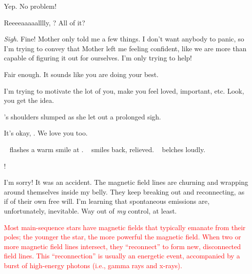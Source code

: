 \documentclass[main.tex]{subfiles}
\begin{document}
\par \Maia Yep.  No problem!  

\par \Sterope Reeeeaaaaalllly, \rmmaia?  All of it?

\par \Maia \textit{Sigh}.  Fine!  Mother only told me a few things.  I don't want anybody to panic, so I'm trying to convey that Mother left me feeling confident, like we are more than capable of figuring it out for ourselves.  I'm only trying to help!  

\par \Sterope Fair enough.  It sounds like you are doing your best.

\par \Maia I'm trying to motivate the lot of you, make you feel loved, important, etc.  Look, you get the idea. 

\par \nar \rmmaia's shoulders slumped as she let out a prolonged sigh.

\par \Sterope It's okay, \rmmaia.  We love you too.

\par \nar \rmsterope~ flashes a warm smile at \rmmaia.  \rmmaia~ smiles back, relieved.  \rmalcyone~ belches loudly.

\par \Sterope \rmalcyone!

\par \Alcyone I'm sorry!  It was an accident.  The magnetic field lines are churning and wrapping around themselves inside my belly.  They keep breaking out and reconnecting, as if of their own free will.  I'm learning that spontaneous emissions are, unfortunately, inevitable.  Way out of \textit{my} control, at least.

\begin{tcolorbox}[sharp corners, colback=red!30, colframe=red!80!blue, title=Reconnection of Magnetic Field Lines]
\par \textcolor{red} {Most main-sequence stars have magnetic fields that typically emanate from their poles; the younger the star, the more powerful the magnetic field.  When two or more magnetic field lines intersect, they ``reconnect'' to form new, disconnected field lines.  This ``reconnection'' is usually an energetic event, accompanied by a burst of high-energy photons (i.e., gamma rays and x-rays).}   
\end{tcolorbox}
\end{document}
